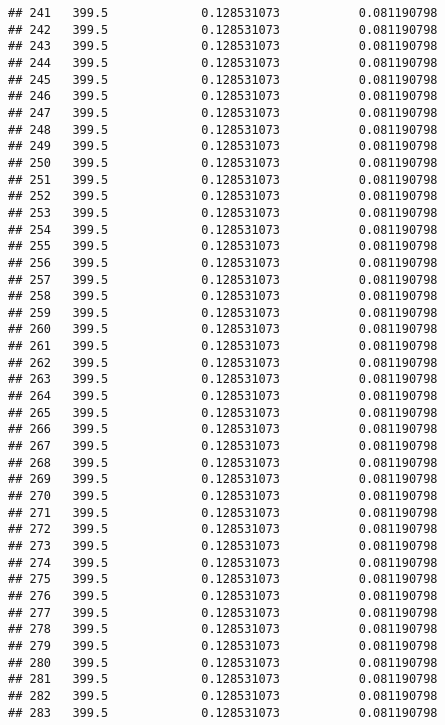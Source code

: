 \documentclass[]{article}
\begin{document}
\begin{verbatim}
## 241   399.5             0.128531073           0.081190798
## 242   399.5             0.128531073           0.081190798
## 243   399.5             0.128531073           0.081190798
## 244   399.5             0.128531073           0.081190798
## 245   399.5             0.128531073           0.081190798
## 246   399.5             0.128531073           0.081190798
## 247   399.5             0.128531073           0.081190798
## 248   399.5             0.128531073           0.081190798
## 249   399.5             0.128531073           0.081190798
## 250   399.5             0.128531073           0.081190798
## 251   399.5             0.128531073           0.081190798
## 252   399.5             0.128531073           0.081190798
## 253   399.5             0.128531073           0.081190798
## 254   399.5             0.128531073           0.081190798
## 255   399.5             0.128531073           0.081190798
## 256   399.5             0.128531073           0.081190798
## 257   399.5             0.128531073           0.081190798
## 258   399.5             0.128531073           0.081190798
## 259   399.5             0.128531073           0.081190798
## 260   399.5             0.128531073           0.081190798
## 261   399.5             0.128531073           0.081190798
## 262   399.5             0.128531073           0.081190798
## 263   399.5             0.128531073           0.081190798
## 264   399.5             0.128531073           0.081190798
## 265   399.5             0.128531073           0.081190798
## 266   399.5             0.128531073           0.081190798
## 267   399.5             0.128531073           0.081190798
## 268   399.5             0.128531073           0.081190798
## 269   399.5             0.128531073           0.081190798
## 270   399.5             0.128531073           0.081190798
## 271   399.5             0.128531073           0.081190798
## 272   399.5             0.128531073           0.081190798
## 273   399.5             0.128531073           0.081190798
## 274   399.5             0.128531073           0.081190798
## 275   399.5             0.128531073           0.081190798
## 276   399.5             0.128531073           0.081190798
## 277   399.5             0.128531073           0.081190798
## 278   399.5             0.128531073           0.081190798
## 279   399.5             0.128531073           0.081190798
## 280   399.5             0.128531073           0.081190798
## 281   399.5             0.128531073           0.081190798
## 282   399.5             0.128531073           0.081190798
## 283   399.5             0.128531073           0.081190798

\end{verbatim}
\end{document}
